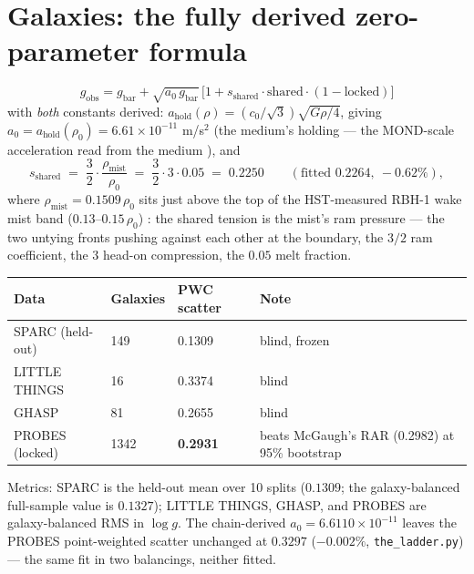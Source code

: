 \documentclass[11pt, a4paper]{article}
\newcommand{\cnot}{\ensuremath{c_0}}
\newcommand{\rhonot}{\ensuremath{\rho_0}}
\begin{document}
\section{Galaxies: the fully derived zero-parameter formula}
\label{sec:galaxies}

\begin{equation}
g_{\mathrm{obs}} = g_{\mathrm{bar}} + \sqrt{a_0\,g_{\mathrm{bar}}}\,
\Big[1 + s_{\mathrm{shared}}\cdot \mathrm{shared}\cdot(1-\mathrm{locked})\Big]
\end{equation}
with \emph{both} constants derived:
$a_{\mathrm{hold}}(\rho) = (\cnot/\sqrt3)\sqrt{G\rho/4}$, giving
$a_0 = a_{\mathrm{hold}}(\rhonot) =
6.61\times10^{-11}$ m/s$^2$ (the medium's holding --- the MOND-scale acceleration
read from the medium \cite{milgrom1983,mcgaugh2016}), and
\begin{equation}
s_{\mathrm{shared}} \;=\; \frac{3}{2}\cdot\frac{\rho_{\mathrm{mist}}}{\rhonot}
\;=\; \frac32\cdot 3\cdot 0.05 \;=\; 0.2250
\qquad (\text{fitted } 0.2264,\ -0.62\%),
\end{equation}
where $\rho_{\mathrm{mist}} = 0.1509\,\rhonot$ sits just above the top of the
HST-measured RBH-1 wake mist band ($0.13$--$0.15\,\rhonot$)
\cite{vandokkum2025}: the shared tension is the mist's ram pressure --- the two
untying fronts pushing against each other at the boundary, the $3/2$ ram
coefficient, the $3$ head-on compression, the $0.05$ melt fraction.

\begin{center}
\small
\begin{tabular}{llll}
\toprule
Data & Galaxies & PWC scatter & Note \\
\midrule
SPARC (held-out) \cite{mcgaugh2016} & 149 & 0.1309 & blind, frozen \\
LITTLE THINGS \cite{littlethings2015} & 16 & 0.3374 & blind \\
GHASP \cite{ghasp} & 81 & 0.2655 & blind \\
PROBES (locked) \cite{probes2022} & 1342 & \textbf{0.2931} & beats McGaugh's RAR (0.2982) at 95\% bootstrap \\
\bottomrule
\end{tabular}
\end{center}
Metrics: SPARC is the held-out mean over 10 splits ($0.1309$; the galaxy-balanced
full-sample value is $0.1327$); LITTLE THINGS, GHASP, and PROBES are
galaxy-balanced RMS in $\log g$. The chain-derived $a_0 = 6.6110\times10^{-11}$
leaves the PROBES point-weighted scatter unchanged at $0.3297$ ($-0.002\%$,
\texttt{the\_ladder.py}) --- the same fit in two balancings, neither fitted.
\end{document}
